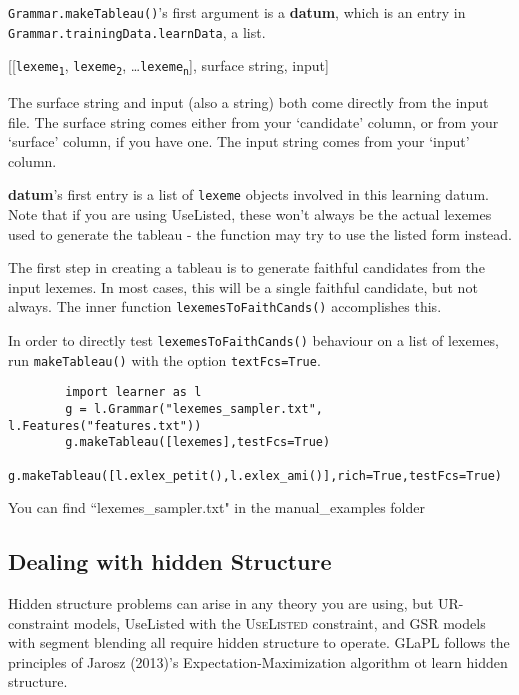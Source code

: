 \documentclass[12]{article}
\begin{document}
	\texttt{Grammar.makeTableau()}'s first argument is a {\bf datum}, which is an entry in \texttt{Grammar.trainingData.learnData}, a list.
	
	\begin{exe}
		  [[\texttt{lexeme\textsubscript{1}}, \texttt{lexeme\textsubscript{2}}, \ldots \texttt{lexeme\textsubscript{n}}], surface string, input]
	\end{exe}

	The surface string and input (also a string) both come directly from the input file.  The surface string comes either from your `candidate' column, or from your `surface' column, if you have one.  The input string comes from your `input' column.
	
	{\bf datum}'s first entry is a list of \texttt{lexeme} objects involved in this learning datum.  Note that if you are using UseListed, these won't always be the actual lexemes used to generate the tableau - the function may try to use the listed form instead.
	
	The first step in creating a tableau is to generate faithful candidates from the input lexemes.  In most cases, this will be a single faithful candidate, but not always.  The inner function \texttt{lexemesToFaithCands()} accomplishes this.
	
	In order to directly test \texttt{lexemesToFaithCands()} behaviour on a list of lexemes, run \texttt{makeTableau()} with the option \texttt{textFcs=True}.
	
	\begin{verbatim}
		import learner as l
		g = l.Grammar("lexemes_sampler.txt", l.Features("features.txt"))
		g.makeTableau([lexemes],testFcs=True)
		g.makeTableau([l.exlex_petit(),l.exlex_ami()],rich=True,testFcs=True)
	\end{verbatim}
	
	You can find ``lexemes\_sampler.txt" in the manual\_examples folder
	
	\subsection{Dealing with hidden Structure}
	
	Hidden structure problems can arise in any theory you are using, but UR-constraint models, UseListed with the \textsc{UseListed} constraint, and GSR models with segment blending all require hidden structure to operate.  GLaPL follows the principles of Jarosz (2013)'s Expectation-Maximization algorithm ot learn hidden structure.  
	
\end{document}
